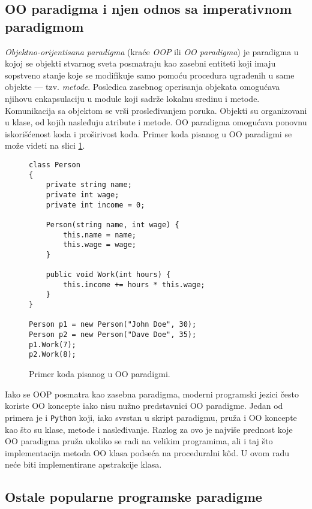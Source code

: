 \subsection{OO paradigma i njen odnos sa imperativnom paradigmom}
\label{subsec:ParadigmOOP}

\emph{Objektno-orijentisana paradigma} (kraće \emph{OOP} ili \emph{OO paradigma}) je paradigma u kojoj se objekti stvarnog sveta posmatraju kao zasebni entiteti koji imaju sopstveno stanje koje se modifikuje samo pomoću procedura ugrađenih u same objekte --- tzv. \emph{metode}. Posledica zasebnog operisanja objekata omogućava njihovu enkapsulaciju u module koji sadrže lokalnu sredinu i metode. Komunikacija sa objektom se vrši prosleđivanjem poruka. Objekti su organizovani u klase, od kojih nasleđuju atribute i metode. OO paradigma omogućava ponovnu iskorišćenost koda i proširivost koda. Primer koda pisanog u OO paradigmi se može videti na slici \ref{fig:ParadigmOO}.

\begin{figure}[h!]
\begin{lstlisting}
class Person
{
    private string name;
    private int wage;
    private int income = 0;

    Person(string name, int wage) {
        this.name = name;
        this.wage = wage;
    }

    public void Work(int hours) {
        this.income += hours * this.wage;
    }
}

Person p1 = new Person("John Doe", 30);
Person p2 = new Person("Dave Doe", 35);
p1.Work(7);
p2.Work(8);
\end{lstlisting}
\caption{Primer koda pisanog u OO paradigmi.}
\label{fig:ParadigmOO}
\end{figure}

Iako se OOP posmatra kao zasebna paradigma, moderni programski jezici često koriste OO koncepte iako nisu nužno predstavnici OO paradigme. Jedan od primera je i \texttt{Python} koji, iako svrstan u skript paradigmu, pruža i OO koncepte kao što su klase, metode i nasleđivanje. Razlog za ovo je najviše prednost koje OO paradigma pruža ukoliko se radi na velikim programima, ali i taj što implementacija metoda OO klasa podseća na proceduralni k\^od. U ovom radu neće biti implementirane apstrakcije klasa.

\subsection{Ostale popularne programske paradigme}
\label{subsec:ParadigmsOther}

